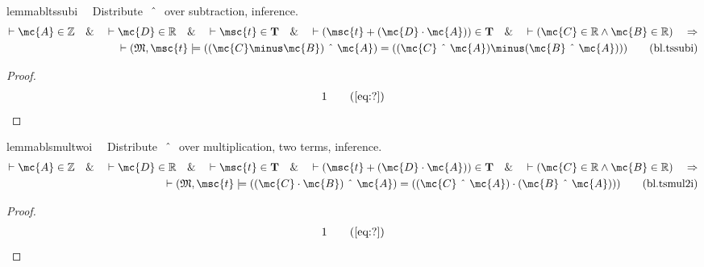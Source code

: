 \begin{restatable}{lemma}{bltssubi}~~ Distribute $~\string^~$ over subtraction,
inference.
\begin{align}
\vdash \mc{A} \in \mathbb{Z}\quad\&\quad \vdash \mc{D} \in
    \mathbb{R}\quad\&\quad \vdash \msc{t} \in \mathbf{T}\quad\&\quad \vdash (
    \msc{t} + ( \mc{D} \cdot \mc{A} ) ) \in \mathbf{T}\quad\&\quad \vdash (
    \mc{C} \in \mathbb{R} \wedge \mc{B} \in \mathbb{R} )\quad\Rightarrow \notag \\ 
	\quad
    \vdash ( \mathfrak{M} , \msc{t} \models ( ( \mc{C} \minus \mc{B} )
    ~\string^~ \mc{A} ) = ( ( \mc{C} ~\string^~ \mc{A} ) \minus ( \mc{B}
    ~\string^~ \mc{A} ) ) )\label{eq:bl.tssubi}\tag{bl.tssubi}
\end{align}
\end{restatable}

\begin{proof}
\begin{align}
  1 &&  & &(\mbox{\ref{eq:?}})\notag
\end{align}
\end{proof}

\begin{restatable}{lemma}{blsmultwoi}~~ Distribute $~\string^~$ over
multiplication, two terms, inference.
\begin{align}
\vdash \mc{A} \in \mathbb{Z}\quad\&\quad \vdash \mc{D} \in
    \mathbb{R}\quad\&\quad \vdash \msc{t} \in \mathbf{T}\quad\&\quad \vdash (
    \msc{t} + ( \mc{D} \cdot \mc{A} ) ) \in \mathbf{T}\quad\&\quad \vdash (
    \mc{C} \in \mathbb{R} \wedge \mc{B} \in \mathbb{R} )\quad\Rightarrow \notag \\ 
	\quad
    \vdash ( \mathfrak{M} , \msc{t} \models ( ( \mc{C} \cdot \mc{B} )
    ~\string^~ \mc{A} ) = ( ( \mc{C} ~\string^~ \mc{A} ) \cdot ( \mc{B}
    ~\string^~ \mc{A} ) ) )\label{eq:bl.tsmul2i}\tag{bl.tsmul2i}
\end{align}
\end{restatable}

\begin{proof}
\begin{align}
  1 &&  & &(\mbox{\ref{eq:?}})\notag
\end{align}
\end{proof}

